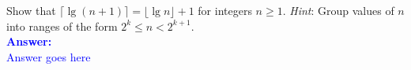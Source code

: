 \item{}
Show that $\lceil\lg(n+1)\rceil=\lfloor\lg n\rfloor+1$ for integers
$n\ge1$. \emph{Hint}: Group values of $n$ into ranges of the form
$2^k\le n<2^{k+1}$.\\[12pt]
\ifanswers
\textcolor{blue}{
\textbf{Answer:}\\[6pt]
Answer goes here
}
\newpage
\fi
